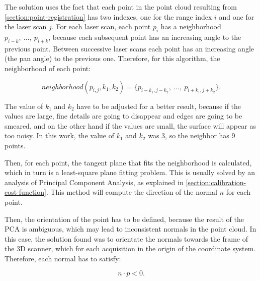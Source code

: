 The solution uses the fact that each point in the point cloud resulting from \cref{section:point-registration} has two indexes, one for the range index $i$ and one for the laser scan $j$. For each laser scan, each point $p_i$ has a neighborhood ${p_{i-k}, \ \dots, \ p_{i+k}}$, because each subsequent point has an increasing angle to the previous point. Between successive laser scans each point has an increasing angle (the pan angle) to the previous one. Therefore, for this algorithm, the neighborhood of each point: 

\begin{equation}
\label{eqn:point-neighborhood}
    neighborhood(p_{i,j}, k_1, k_2) = \{p_{i-k_1, j-k_2}, \ \dots, \ p_{i+k_1, j+k_2}\}.
\end{equation}

\noindent
The value of $k_1$ and $k_2$ have to be adjusted for a better result, because if the values are large, fine details are going to disappear and edges are going to be smeared, and on the other hand if the values are small, the surface will appear as too noisy. In this work, the value of $k_1$ and $k_2$ was 3, so the neighbor has 9 points.

Then, for each point, the tangent plane that fits the neighborhood is calculated, which in turn is a least-square plane fitting problem. This is usually solved by an analysis of Principal Component Analysis, as explained in \cref{section:calibration-cost-function}. This method will compute the direction of the normal $n$ for each point.

Then, the orientation of the point has to be defined, because the result of the PCA is ambiguous, which may lead to inconsistent normals in the point cloud. In this case, the solution found was to orientate the normals towards the frame of the 3D scanner, which for each acquisition in the origin of the coordinate system. Therefore, each normal has to satisfy:

\begin{equation}
\label{eqn:normal-orientation}
    n \cdot p < 0.
\end{equation}
